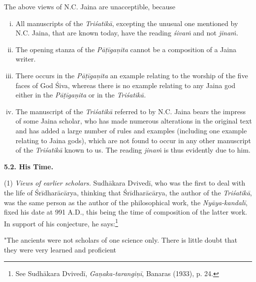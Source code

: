 \documentclass[10pt, openany]{book}
\begin{document}
\vspace{3mm}
{The above views of N.C. Jaina are unacceptible,}
{because}

\begin{enumerate}[(i)]
    \item {All manuscripts of the \textit{Triśatikā}, excepting the unusual one mentioned by N.C. Jaina, that are known}
{today, have the reading \textit{śivaṁ} and not \textit{jinaṁ.}}

\item{The opening stanza of the \textit{Pāṭīgaṇita} cannot be a}
{composition of a Jaina writer.}

\item{There occurs in the \textit{Pāṭīgaṇita} an example relating}
{to the worship of the five faces of God Śiva, whereas}
{there is no example relating to any Jaina god either}
{in the \textit{Pāṭīgaṇita} or in the \textit{Triśatikā.}}

\item{The manuscript of the \textit{Triśatikā} referred to by N.C.}
{Jaina bears the impress of some Jaina scholar, who} 
{has made numerous alterations in the original text} 
{and has added a large number of rules and examples (including one example relating to Jaina}
{gods), which are not found to occur in any other}
{manuscript of the \textit{Triśatikā} known to us. The}
{reading \textit{jinaṁ} is thus evidently due to him.}
\end{enumerate}
\vspace{1mm}

\noindent \textbf{5.2. His Time.}
\vspace{1mm}

{(1) \textit{Views of earlier scholars.}{ Sudhākara Dvivedī, who}
{was the first to deal with the life of Śrīdharācārya, thinking}
{that Śrīdharācārya, the author of the \textit{Triśatikā}, was the same}
{person as the author of the philosophical work, the \textit{Nyāya-kandalī}, fixed his date at 991 A.D., this being the time of}
{composition of the latter work. In support of his conjecture,}
{he says:}}\renewcommand{\thefootnote}{1}\footnote{\hspace{-2mm} \englishfont See Sudhākara Dvivedī, \textit{Gaṇaka-tarangiṇī}, Banaras (1933), p. 24.}
\vspace{3mm}

{\eqt "The ancients were not scholars of one science only. There is little doubt that they were very learned and proficient}

\newpage
\end{document}
